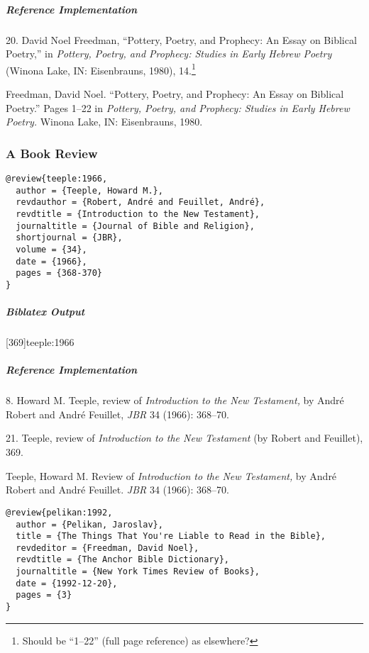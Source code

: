 \documentclass[a4paper]{article}
\newenvironment{biboutput}{%
  \subparagraph{Biblatex Output}
}{\color{black}}
\newenvironment{refimp}{%
  \subparagraph{Reference Implementation}
  \color{reference-colour}
  \rm
}{\par\color{black}}
\begin{document}
\begin{refimp}
  20. David Noel Freedman, “Pottery, Poetry, and Prophecy: An Essay on Biblical
  Poetry,” in \emph{Pottery, Poetry, and Prophecy: Studies in Early Hebrew
  Poetry} (Winona Lake, IN: Eisenbrauns, 1980), 14.\footnote{Should be “1–22”
  (full page reference) as elsewhere?}

  \hangindent\bibindent Freedman, David Noel. “Pottery, Poetry, and Prophecy:
  An Essay on Biblical Poetry.” Pages 1–22 in \emph{Pottery, Poetry, and
  Prophecy: Studies in Early Hebrew Poetry.} Winona Lake, IN: Eisenbrauns,
  1980.
\end{refimp}

\subsubsection{A Book Review}

\begin{lstlisting}
@review{teeple:1966,
  author = {Teeple, Howard M.},
  revdauthor = {Robert, André and Feuillet, André},
  revdtitle = {Introduction to the New Testament},
  journaltitle = {Journal of Bible and Religion},
  shortjournal = {JBR},
  volume = {34},
  date = {1966},
  pages = {368-370}
}
\end{lstlisting}

\begin{biboutput}
  [369]{teeple:1966}
\end{biboutput}

\begin{refimp}
  8. Howard M. Teeple, review of \emph{Introduction to the New Testament,} by
  André Robert and André Feuillet, \emph{JBR} 34 (1966): 368–70.
  
  21. Teeple, review of \emph{Introduction to the New Testament} (by Robert
  and Feuillet), 369.

  \hangindent\bibindent Teeple, Howard M. Review of \emph{Introduction to the
  New Testament,} by André Robert and André Feuillet. \emph{JBR} 34 (1966):
  368–70.

\end{refimp}

\begin{lstlisting}
@review{pelikan:1992,
  author = {Pelikan, Jaroslav},
  title = {The Things That You're Liable to Read in the Bible},
  revdeditor = {Freedman, David Noel},
  revdtitle = {The Anchor Bible Dictionary},
  journaltitle = {New York Times Review of Books},
  date = {1992-12-20},
  pages = {3}
}
\end{lstlisting}
\end{document}
